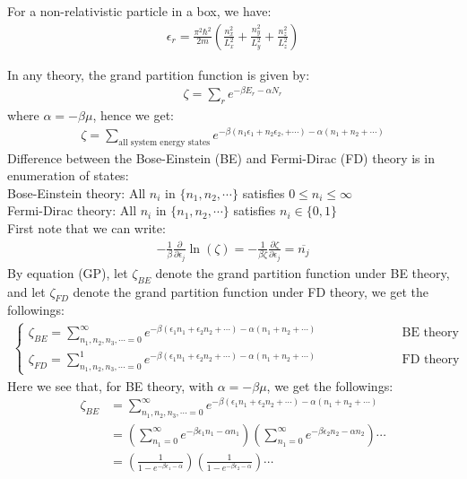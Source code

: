 \documentclass[11pt,oneside]{book}
\theoremstyle{break}
\theoremstyle{break}
\begin{document}
For a non-relativistic particle in a box, we have:
\begin{align*}
\epsilon_r = \frac{\pi^2 \hbar^2}{2m}\left( \frac{n_x^2}{L_x^2} + \frac{n_y^2}{L_y^2} + \frac{n_z^2}{L_z^2}\right)
\end{align*} 

In any theory, the grand partition function is given by:
\begin{align*}
\zeta = \sum_{r} e^{-\beta E_r - \alpha N_r}
\end{align*}
where $\alpha = -\beta \mu$, hence we get:
\begin{align*}
\zeta = \sum_{\text{all system energy states}} e^{-\beta (n_1 \epsilon_1+n_2\epsilon_2, + \cdots) - \alpha(n_1 + n_2+\cdots)} \tag{GP}
\end{align*}
Difference between the Bose-Einstein (BE) and Fermi-Dirac (FD) theory is in enumeration of states:\\
Bose-Einstein theory: All $n_i$ in $\{n_1,n_2,\cdots\}$ satisfies $0\leq n_i \leq \infty$\\
Fermi-Dirac theory: All $n_i$ in $\{n_1,n_2,\cdots\}$ satisfies $n_i \in \{0,1\}$\\

First note that we can write:
\begin{align*}
-\frac{1}{\beta}\frac{\partial}{\partial \epsilon_j} \ln(\zeta) = -\frac{1}{\beta\zeta} \frac{\partial\zeta}{\partial \epsilon_j}  = \overline{n_j}
\end{align*}
By equation (GP), let $\zeta_{BE}$ denote the grand partition function under BE theory, and let $\zeta_{FD}$ denote the grand partition function under FD theory, we get the followings:
\begin{align*}
\begin{cases}
\zeta_{BE} = \sum_{n_1,n_2,n_3,\cdots = 0}^{\infty} e^{-\beta (\epsilon_1 n_1 +\epsilon_2n_2 + \cdots) - \alpha(n_1+n_2+\cdots)} & {}\qquad\qquad\qquad\text{BE theory}\\
\zeta_{FD} = \sum_{n_1,n_2,n_3,\cdots = 0}^{1} e^{-\beta (\epsilon_1 n_1 +\epsilon_2n_2 + \cdots) - \alpha(n_1+n_2+\cdots)} & {}\qquad\qquad\qquad\text{FD theory}
\end{cases}
\end{align*}
Here we see that, for BE theory, with $\alpha = -\beta \mu$, we get the followings:
\begin{align*}
\zeta_{BE} &=  \sum_{n_1,n_2,n_3,\cdots = 0}^{\infty} e^{-\beta (\epsilon_1 n_1 +\epsilon_2n_2 + \cdots) - \alpha(n_1+n_2+\cdots)}\\
&=\left( \sum_{n_1 = 0}^{\infty} e^{-\beta \epsilon_1 n_1 - \alpha n_1}\right)\left( \sum_{n_1 = 0}^{\infty} e^{-\beta \epsilon_2 n_2 - \alpha n_2}\right)\cdots \\
&= \left(\frac{1}{1-e^{-\beta \epsilon_1 - \alpha}} \right) \left(\frac{1}{1-e^{-\beta \epsilon_2 - \alpha}} \right)\cdots
\end{align*}
\end{document}
